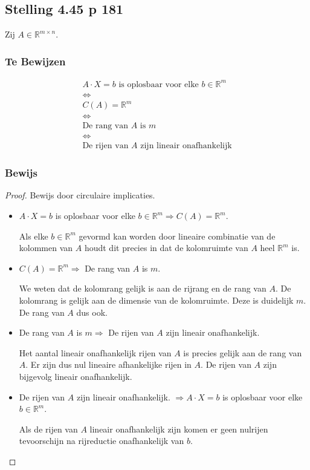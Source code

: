 \documentclass[lineaire_algebra_oplossingen.tex]{subfiles}
\begin{document}
\subsection{Stelling 4.45 p 181}
\label{4.45}
Zij $A \in \mathbb{R}^{m\times n}$.

\subsubsection*{Te Bewijzen}
\begin{gather*}
A\cdot X = b \text{ is oplosbaar voor elke } b\in \mathbb{R}^m \\
\Leftrightarrow \\
C(A) = \mathbb{R}^m \\
\Leftrightarrow \\
\text{De rang van $A$ is $m$} \\
\Leftrightarrow \\
\text{De rijen van $A$ zijn lineair onafhankelijk}
\end{gather*}

\subsubsection*{Bewijs}
\begin{proof}
Bewijs door circulaire implicaties.
\begin{itemize}
\item
$A\cdot X = b$ is oplosbaar voor elke $b\in \mathbb{R}^m \Rightarrow C(A) = \mathbb{R}^m$.

Als elke $b\in \mathbb{R}^m$ gevormd kan worden door lineaire combinatie van de kolommen van $A$ houdt dit precies in dat de kolomruimte van $A$ heel $\mathbb{R}^m$ is.

\item
$C(A) = \mathbb{R}^m \Rightarrow $ De rang van $A$ is $m$.

We weten dat de kolomrang gelijk is aan de rijrang en de rang van $A$. De kolomrang is gelijk aan de dimensie van de kolomruimte. Deze is duidelijk $m$. De rang van $A$ dus ook.

\item
De rang van $A$ is $m \Rightarrow$ De rijen van $A$ zijn lineair onafhankelijk.
 
Het aantal lineair onafhankelijk rijen van $A$ is precies gelijk aan de rang van $A$. Er zijn dus nul lineaire afhankelijke rijen in $A$. De rijen van $A$ zijn bijgevolg lineair onafhankelijk.

\item
De rijen van $A$ zijn lineair onafhankelijk. $\Rightarrow A\cdot X = b$ is oplosbaar voor elke $b\in \mathbb{R}^m$.

Als de rijen van $A$ lineair onafhankelijk zijn komen er geen nulrijen tevoorschijn na rijreductie onafhankelijk van $b$.
\end{itemize}
\end{proof}
\end{document}
